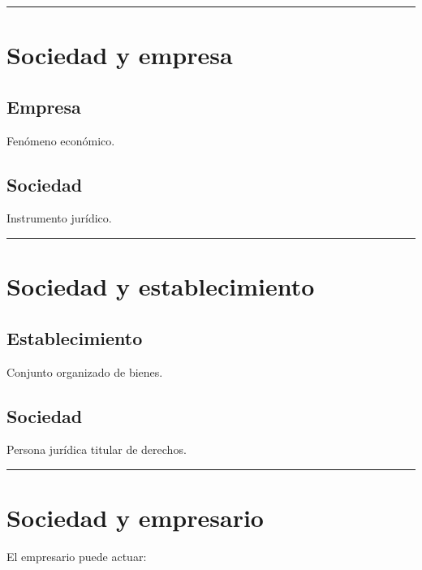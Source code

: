 \documentclass[
  spanish,
  letterpaper,
  DIV=11,
  numbers=noendperiod]{scrartcl}
\begin{document}
\begin{center}\rule{0.5\linewidth}{0.5pt}\end{center}

\section{Sociedad y empresa}\label{sociedad-y-empresa}

\subsection{Empresa}\label{empresa-1}

Fenómeno económico.

\subsection{Sociedad}\label{sociedad-1}

Instrumento jurídico.

\begin{center}\rule{0.5\linewidth}{0.5pt}\end{center}

\section{Sociedad y establecimiento}\label{sociedad-y-establecimiento}

\subsection{Establecimiento}\label{establecimiento}

Conjunto organizado de bienes.

\subsection{Sociedad}\label{sociedad-2}

Persona jurídica titular de derechos.

\begin{center}\rule{0.5\linewidth}{0.5pt}\end{center}

\section{Sociedad y empresario}\label{sociedad-y-empresario-1}

El empresario puede actuar:
\end{document}
